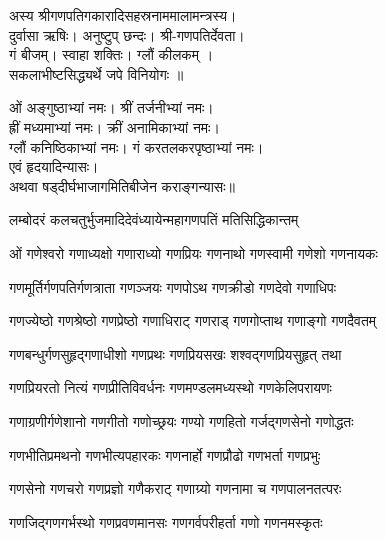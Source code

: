 

अस्य श्रीगणपतिगकारादिसहस्रनाममालामन्त्रस्य।\\
दुर्वासा ऋषिः। अनुष्टुप् छन्दः। श्री-गणपतिर्देवता।\\
गं बीजम्। स्वाहा शक्तिः। ग्लौं कीलकम् ।\\
 सकलाभीष्टसिद्ध्यर्थे जपे विनियोगः ॥

ओं अङ्गुष्ठाभ्यां नमः। श्रीं तर्जनीभ्यां नमः।\\
ह्रीं मध्यमाभ्यां नमः। क्रीं अनामिकाभ्यां नमः।\\
ग्लौं कनिष्ठिकाभ्यां नमः। गं करतलकरपृष्ठाभ्यां नमः।\\
एवं हृदयादिन्यासः।\\
अथवा षड्दीर्घभाजागमितिबीजेन कराङ्गन्यासः॥


{लम्बोदरं कलचतुर्भुजमादिदेवं}{ध्यायेन्महागणपतिं मतिसिद्धिकान्तम्}


\twolineshloka
{ओं गणेश्वरो गणाध्यक्षो गणाराध्यो गणप्रियः}
{गणनाथो गणस्वामी गणेशो गणनायकः}%

\twolineshloka
{गणमूर्तिर्गणपतिर्गणत्राता गणञ्जयः}%
{गणपोऽथ गणक्रीडो गणदेवो गणाधिपः}%

\twolineshloka
{गणज्येष्ठो गणश्रेष्ठो गणप्रेष्ठो गणाधिराट्}%
{गणराड् गणगोप्ताथ गणाङ्गो गणदैवतम्}%

\twolineshloka
{गणबन्धुर्गणसुहृद्गणाधीशो गणप्रथः}%
{गणप्रियसखः शश्वद्गणप्रियसुहृत् तथा}%

\twolineshloka
{गणप्रियरतो नित्यं गणप्रीतिविवर्धनः}%
{गणमण्डलमध्यस्थो गणकेलिपरायणः}%

\twolineshloka
{गणाग्रणीर्गणेशानो गणगीतो गणोच्छ्रयः}%
{गण्यो गणहितो गर्जद्गणसेनो गणोद्धतः}%

\twolineshloka
{गणभीतिप्रमथनो गणभीत्यपहारकः}%
{गणनार्हो गणप्रौढो गणभर्ता गणप्रभुः}%

\twolineshloka
{गणसेनो गणचरो गणप्रज्ञो गणैकराट्}%
{गणाग्र्यो गणनामा च गणपालनतत्परः}%

\twolineshloka
{गणजिद्गणगर्भस्थो गणप्रवणमानसः}%
{गणगर्वपरीहर्ता गणो गणनमस्कृतः}%

